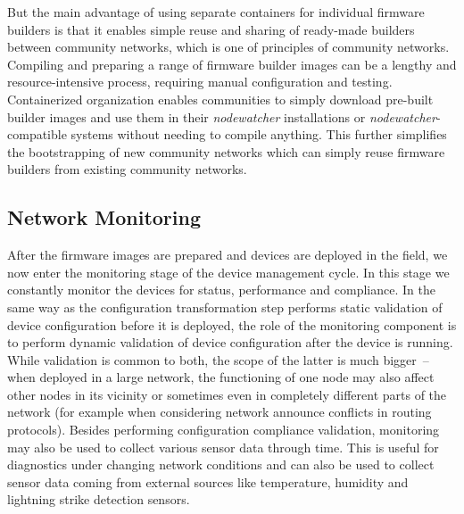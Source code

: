 \documentclass[5p,sort&compress]{elsarticle}
\newcommand{\nodewatcher}{\textit{nodewatcher}}
\begin{document}
But the main advantage of using separate containers for individual firmware builders is that it enables simple reuse and sharing of ready-made builders between community networks, which is one of principles of community networks.
Compiling and preparing a range of firmware builder images can be a lengthy and resource-intensive process, requiring manual configuration and testing.
Containerized organization enables communities to simply download pre-built builder images and use them in their \nodewatcher{} installations or \nodewatcher{}-compatible systems without needing to compile anything.
This further simplifies the bootstrapping of new community networks which can simply reuse firmware builders from existing community networks.

\subsection{Network Monitoring}
\label{sec:network-monitoring}

After the firmware images are prepared and devices are deployed in the field, we now enter the monitoring stage of the device management cycle.
In this stage we constantly monitor the devices for status, performance and compliance.
In the same way as the configuration transformation step performs static validation of device configuration before it is deployed, the role of the monitoring component is to perform dynamic validation of device configuration after the device is running.
While validation is common to both, the scope of the latter is much bigger~-- when deployed in a large network, the functioning of one node may also affect other nodes in its vicinity or sometimes even in completely different parts of the network (for example when considering network announce conflicts in routing protocols).
Besides performing configuration compliance validation, monitoring may also be used to collect various sensor data through time.
This is useful for diagnostics under changing network conditions and can also be used to collect sensor data coming from external sources like temperature, humidity and lightning strike detection sensors.
\end{document}

